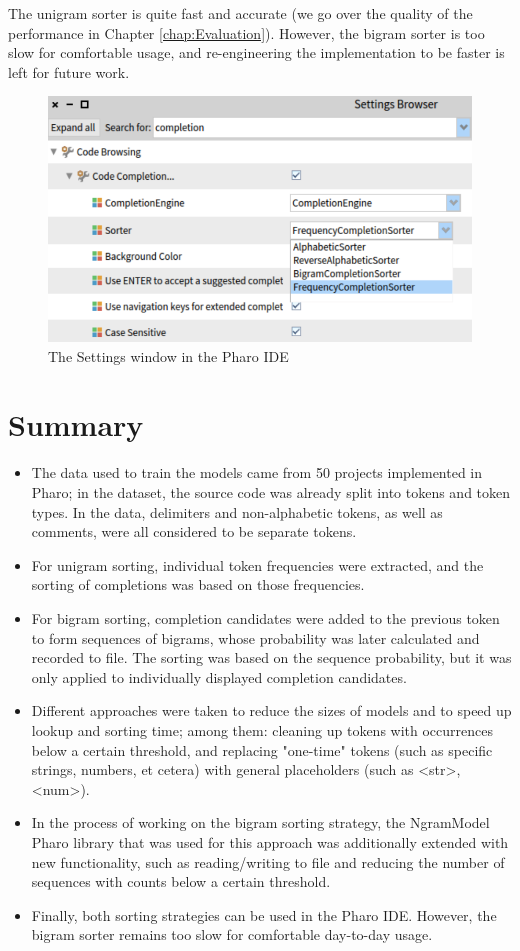 The unigram sorter is quite fast and accurate (we go over the quality of the performance in Chapter \ref{chap:Evaluation}). However, the bigram sorter is too slow for comfortable usage, and re-engineering the implementation to be faster is left for future work.

\begin{figure}[H]
    \centering
    \includegraphics[width=0.9\linewidth]{images/settings.png}
    \caption{The Settings window in the Pharo IDE}
    \label{fig:settings}
\end{figure}

\section{Summary}
\label{sec:ProposedSolution-Summary}
\begin{itemize}
    \item The data used to train the models came from 50 projects implemented in Pharo; in the dataset, the source code was already split into tokens and token types. In the data, delimiters and non-alphabetic tokens, as well as comments, were all considered to be separate tokens.
    \item For unigram sorting, individual token frequencies were extracted, and the sorting of completions was based on those frequencies.
    \item For bigram sorting, completion candidates were added to the previous token to form sequences of bigrams, whose probability was later calculated and recorded to file. The sorting was based on the sequence probability, but it was only applied to individually displayed completion candidates.
    \item Different approaches were taken to reduce the sizes of models and to speed up lookup and sorting time; among them: cleaning up tokens with occurrences below a certain threshold, and replacing "one-time" tokens (such as specific strings, numbers, et cetera) with general placeholders (such as <str>, <num>).
    \item In the process of working on the bigram sorting strategy, the NgramModel Pharo library that was used for this approach was additionally extended with new functionality, such as reading/writing to file and reducing the number of sequences with counts below a certain threshold.
    \item Finally, both sorting strategies can be used in the Pharo IDE. However, the bigram sorter remains too slow for comfortable day-to-day usage.
\end{itemize}